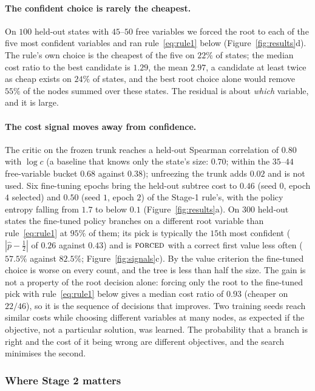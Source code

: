 \documentclass[final,5p,times,twocolumn,authoryear]{elsarticle}
\newcommand{\FORCED}{\textsc{forced}}
\begin{document}
\paragraph{The confident choice is rarely the cheapest.} On $100$ held-out states with $45$--$50$ free variables we forced the root to each of the five most confident variables and ran rule~\eqref{eq:rule1} below (Figure~\ref{fig:results}d). The rule's own choice is the cheapest of the five on $22\%$ of states; the median cost ratio to the best candidate is $1.29$, the mean $2.97$, a candidate at least twice as cheap exists on $24\%$ of states, and the best root choice alone would remove $55\%$ of the nodes summed over these states. The residual is about \emph{which} variable, and it is large.

\paragraph{The cost signal moves away from confidence.} The critic on the frozen trunk reaches a held-out Spearman correlation of $0.80$ with $\log c$ (a baseline that knows only the state's size: $0.70$; within the $35$--$44$ free-variable bucket $0.68$ against $0.38$); unfreezing the trunk adds $0.02$ and is not used. Six fine-tuning epochs bring the held-out subtree cost to $0.46$ (seed $0$, epoch $4$ selected) and $0.50$ (seed $1$, epoch $2$) of the Stage-1 rule's, with the policy entropy falling from $1.7$ to below $0.1$ (Figure~\ref{fig:results}a). On $300$ held-out states the fine-tuned policy branches on a different root variable than rule~\eqref{eq:rule1} at $95\%$ of them; its pick is typically the $15$th most confident ($|\hat p-\frac12|$ of $0.26$ against $0.43$) and is $\FORCED$ with a correct first value less often ($57.5\%$ against $82.5\%$; Figure~\ref{fig:signals}c). By the value criterion the fine-tuned choice is worse on every count, and the tree is less than half the size. The gain is not a property of the root decision alone: forcing only the root to the fine-tuned pick with rule~\eqref{eq:rule1} below gives a median cost ratio of $0.93$ (cheaper on $22/46$), so it is the sequence of decisions that improves. Two training seeds reach similar costs while choosing different variables at many nodes, as expected if the objective, not a particular solution, was learned. The probability that a branch is right and the cost of it being wrong are different objectives, and the search minimises the second.

\subsubsection{Where Stage 2 matters}
\label{sec:res-where}
\end{document}
